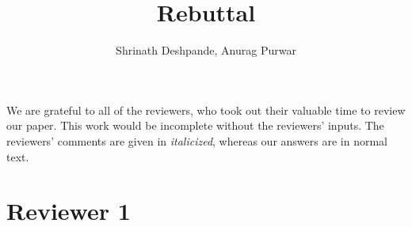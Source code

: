 \documentclass{article}
\title{Rebuttal}
\author{Shrinath Deshpande, Anurag Purwar}
\begin{document}
\maketitle
We are grateful to all of the reviewers, who took out their valuable time to review our paper. This work would be incomplete without the reviewers' inputs.
The reviewers' comments are given in \emph{italicized}, whereas our answers are in normal text.

\section{Reviewer 1}
\end{document}
